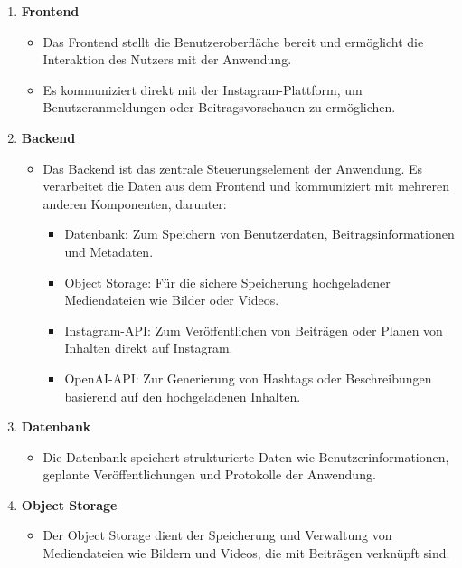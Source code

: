 \begin{enumerate}
    \item \textbf{Frontend}
    \begin{itemize}
        \item Das Frontend stellt die Benutzeroberfläche bereit und ermöglicht die Interaktion des Nutzers mit der Anwendung.
        \item Es kommuniziert direkt mit der Instagram-Plattform, um Benutzeranmeldungen oder Beitragsvorschauen zu ermöglichen.
    \end{itemize}
    
    \item \textbf{Backend}
    \begin{itemize}
        \item Das Backend ist das zentrale Steuerungselement der Anwendung. Es verarbeitet die Daten aus dem Frontend und kommuniziert mit mehreren anderen Komponenten, darunter:
        \begin{itemize}
            \item Datenbank: Zum Speichern von Benutzerdaten, Beitragsinformationen und Metadaten.
            \item Object Storage: Für die sichere Speicherung hochgeladener Mediendateien wie Bilder oder Videos.
            \item Instagram-\ac{API}: Zum Veröffentlichen von Beiträgen oder Planen von Inhalten direkt auf Instagram.
            \item OpenAI-\ac{API}: Zur Generierung von Hashtags oder Beschreibungen basierend auf den hochgeladenen Inhalten.
        \end{itemize}
    \end{itemize}
    
    \item \textbf{Datenbank}
    \begin{itemize}
        \item Die Datenbank speichert strukturierte Daten wie Benutzerinformationen, geplante Veröffentlichungen und Protokolle der Anwendung.
    \end{itemize}
    
    \item \textbf{Object Storage}
    \begin{itemize}
        \item Der Object Storage dient der Speicherung und Verwaltung von Mediendateien wie Bildern und Videos, die mit Beiträgen verknüpft sind.
    \end{itemize}
    

\end{enumerate}
